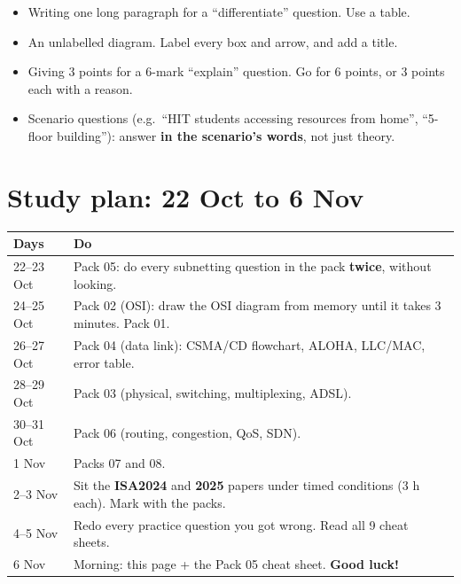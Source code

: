 \documentclass[10pt]{article}
\begin{document}
\begin{trap}
\begin{itemize}
\item Writing one long paragraph for a ``differentiate'' question. Use a table.
\item An unlabelled diagram. Label every box and arrow, and add a title.
\item Giving 3 points for a 6-mark ``explain'' question. Go for 6 points, or 3 points each with a reason.
\item Scenario questions (e.g.\ ``HIT students accessing resources from home'', ``5-floor building''): answer \textbf{in the scenario's words}, not just theory.
\end{itemize}
\end{trap}

\section{Study plan: 22 Oct to 6 Nov}

\begin{center}\small
\begin{tabularx}{\linewidth}{@{}l X@{}}
\toprule
\textbf{Days} & \textbf{Do}\\\midrule
22--23 Oct & Pack 05: do every subnetting question in the pack \textbf{twice}, without looking.\\
24--25 Oct & Pack 02 (OSI): draw the OSI diagram from memory until it takes 3 minutes. Pack 01.\\
26--27 Oct & Pack 04 (data link): CSMA/CD flowchart, ALOHA, LLC/MAC, error table.\\
28--29 Oct & Pack 03 (physical, switching, multiplexing, ADSL).\\
30--31 Oct & Pack 06 (routing, congestion, QoS, SDN).\\
1 Nov & Packs 07 and 08.\\
2--3 Nov & Sit the \textbf{ISA2024} and \textbf{2025} papers under timed conditions (3 h each). Mark with the packs.\\
4--5 Nov & Redo every practice question you got wrong. Read all 9 cheat sheets.\\
6 Nov & Morning: this page + the Pack 05 cheat sheet. \textbf{Good luck!}\\
\bottomrule
\end{tabularx}
\end{center}
\end{document}
